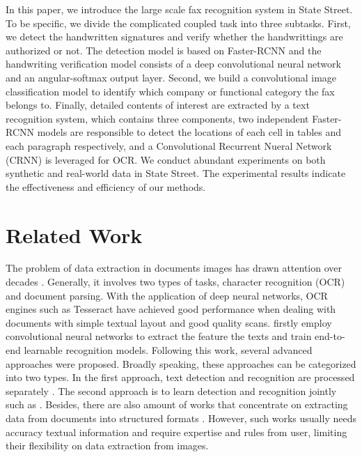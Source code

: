 \documentclass[sigconf]{acmart}
\begin{document}
In this paper, we introduce the large scale fax recognition system in State Street. To be specific, we divide the complicated coupled task into three subtasks. First, we detect the handwritten signatures and verify whether the handwrittings are authorized or not. The detection model is based on Faster-RCNN and the handwriting verification model consists of a deep convolutional neural network and an angular-softmax output layer. Second, we build a convolutional image classification model to identify which company or functional category the fax belongs to. Finally, detailed contents of interest are extracted by a text recognition system, which contains three components, two independent Faster-RCNN models are responsible to detect the locations of each cell in tables and each paragraph respectively, and a Convolutional Recurrent Nueral Network (CRNN) is leveraged for OCR. We conduct abundant experiments on both synthetic and real-world data in State Street. The experimental results indicate the effectiveness and efficiency of our methods.


\section{Related Work}
The problem of data extraction in documents images has drawn attention over decades \cite{nagy2000twenty}. Generally, it involves two types of tasks, character recognition (OCR) and document parsing. With the application of deep neural networks, OCR engines such as Tesseract \cite{smith2007overview} have achieved good performance when dealing with documents with simple textual layout and good quality scans. \citet{jaderberg2014synthetic} firstly employ convolutional neural networks to extract the feature the texts and train end-to-end learnable recognition models. Following this work, several advanced approaches were proposed. Broadly speaking, these approaches can be categorized into two types. In the first approach, text detection and recognition are processed separately \cite{shi2017end, tian2016detecting, he2017deep, lyu2018multi, borisyuk2018rosetta}. The second approach is to learn detection and recognition jointly such as \cite{li2017towards, buvsta2017deep, liu2018fots}. Besides, there are also amount of works that concentrate on extracting data from documents into structured formats \cite{cesarini1998informys, chanod2005legacy, peanho2012semantic, li2016precomputed}. However, such works usually needs accuracy textual information and require expertise and rules from user, limiting their flexibility on data extraction from images.
\end{document}

